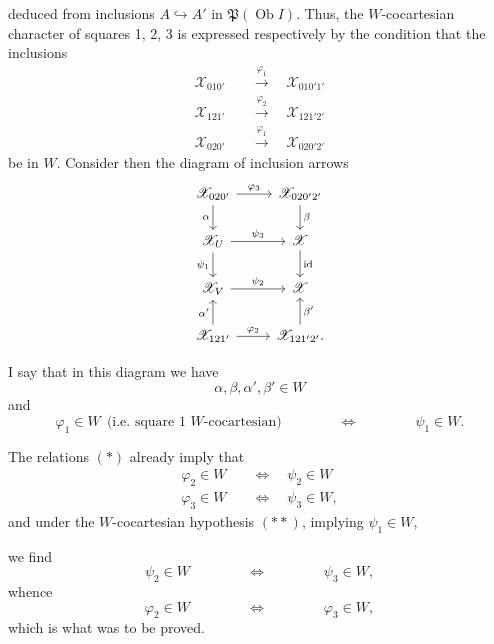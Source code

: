 \documentclass[11pt]{article}
\newcommand{\printedpage}[1]{\marginpar{\footnotesize p.~#1}}
\newcommand{\msp}[1]{\marginpar{\footnotesize [#1]}}
\newcommand{\cX}{\mathscr{X}}
\newcommand{\Ob}{\operatorname{Ob}}
\begin{document}
\msp{page 237}

deduced from inclusions $A \hookrightarrow A'$ in $\mathfrak{P}(\Ob I)$. Thus, the $W$-cocartesian character of squares 1, 2, 3 is expressed respectively by the condition that the inclusions
\[
\begin{aligned}
\cX_{010'} \quad &\xrightarrow{\varphi_1} \quad \cX_{010'1'} \\
\cX_{121'} \quad &\xrightarrow{\varphi_2} \quad \cX_{121'2'} \\
\cX_{020'} \quad &\xrightarrow{\varphi_1} \quad \cX_{020'2'} %
\end{aligned}
\]
be in $W$. Consider then the diagram of inclusion arrows
\printedpage{153}
\[
\begin{tikzcd}[ampersand replacement=\&]
\cX_{020'} \arrow[r, "\varphi_3"] \arrow[d, "\alpha"'] \& \cX_{020'2'} \arrow[d, "\beta"] \\
\cX_U \arrow[r, "\psi_3"] \arrow[d, "\psi_1"'] \& \cX \arrow[d, "\mathrm{id}"] \\
\cX_V \arrow[r, "\psi_2"] \& \cX \\
\cX_{121'} \arrow[r, "\varphi_2"] \arrow[u, "\alpha'"] \& \cX_{121'2'}. \arrow[u, "\beta'"']
\end{tikzcd}
\]

I say that in this diagram we have
\[
\alpha, \beta, \alpha', \beta' \in W
\tag*{$(\ast)$}
\]
and
\[
\varphi_1 \in W \ \ \text{(i.e. square 1 $W$-cocartesian)} \qquad\qquad \Longleftrightarrow \qquad\qquad \psi_1 \in W.
\tag*{$(\ast\ast)$}
\]

The relations $(\ast)$ already imply that %
\[
\begin{aligned}
\varphi_2 \in W \quad &\Longleftrightarrow \quad \psi_2 \in W \\
\varphi_3 \in W \quad &\Longleftrightarrow \quad \psi_3 \in W,
\end{aligned}
\]
and under the $W$-cocartesian hypothesis $(\ast\ast)$, implying $\psi_1 \in W$,

\msp{page 238}

we find
\[
\psi_2 \in W \qquad\qquad \Longleftrightarrow \qquad\qquad \psi_3 \in W,
\]
whence
\[
\varphi_2 \in W \qquad\qquad \Longleftrightarrow \qquad\qquad \varphi_3 \in W,
\]
which is what was to be proved.
\end{document}
